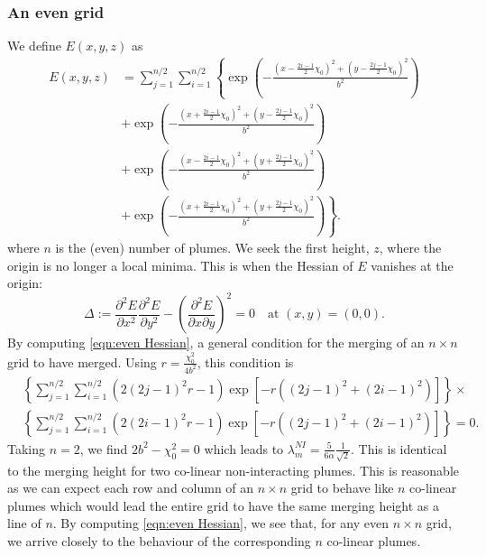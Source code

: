 \documentclass{jfm}
\newcommand{\pdbyd}[3]{\dfrac{\partial^2 #1}{\partial #2 \partial #3}} %
\newcommand{\partialSq}[2]{\dfrac{\partial^2 #1}{\partial #2^2}} %
\begin{document}
	\subsubsection{An even grid}
	We define $E(x,y,z)$ as
	\begin{equation}
		\begin{split}
			E(x,y,z) &= \sum_{j=1}^{n/2}\sum_{i=1}^{n/2}\left\{ \exp\left(-\frac{(x-\frac{2i-1}{2}\chi_0)^2 + (y-\frac{2j-1}{2}\chi_0)^2}{b^2}\right)\right. \\
			&+ \exp\left(-\frac{(x+\frac{2i-1}{2}\chi_0)^2 + (y-\frac{2j-1}{2}\chi_0)^2}{b^2}\right) \\
			&+ \exp\left(-\frac{(x-\frac{2i-1}{2}\chi_0)^2 + (y+\frac{2j-1}{2}\chi_0)^2}{b^2}\right)\\
			&+ \left.\exp\left(-\frac{(x+\frac{2i-1}{2}\chi_0)^2 + (y+\frac{2j-1}{2}\chi_0)^2}{b^2}\right)\right\}.
			\label{eqn:even grid system}
		\end{split}
	\end{equation}
	where $n$ is the (even) number of plumes. We seek the first height, $z$, where the origin is no longer a local minima. This is when the Hessian of $E$ vanishes at the origin:
	\begin{equation}
	\Delta := \partialSq{E}{x}\partialSq{E}{y} - \left(\pdbyd{E}{x}{y}\right)^2 = 0 \quad \text{at $(x,y) = (0,0)$}. \label{eqn:even Hessian}
	\end{equation}
	By computing \eqref{eqn:even Hessian}, a general condition for the merging of an $n \times n$ grid to have merged. Using $r = \tfrac{\chi_0^2}{4b^2}$, this condition is
	\begin{equation}
		\begin{split}
			&\displaystyle\left\{\sum_{j=1}^{n/2}\sum_{i=1}^{n/2}\left(2(2j-1)^2r - 1\right)\exp\left[-r\left((2j-1)^2+(2i-1)^2\right)\right]\right\}\times \\ &\left\{\sum_{j=1}^{n/2}\sum_{i=1}^{n/2}\left(2(2i-1)^2r - 1\right)\exp\left[-r\left((2j-1)^2+(2i-1)^2\right)\right]\right\} = 0.
			\label{eqn:even grid condition}
		\end{split}
	\end{equation}
	Taking $n = 2$, we find $2b^2 - \chi_0^2 = 0$ which leads to $\lambda_m^{NI} = \tfrac{5}{6\alpha}\tfrac{1}{\sqrt{2}}$. This is identical to the merging height for two co-linear non-interacting plumes. This is reasonable as we can expect each row and column of an $n \times n$ grid to behave like $n$ co-linear plumes which would lead the entire grid to have the same merging height as a line of $n$. By computing \eqref{eqn:even Hessian}, we see that, for any even $n\times n$ grid, we arrive closely to the behaviour of the corresponding $n$ co-linear plumes.
\end{document}

